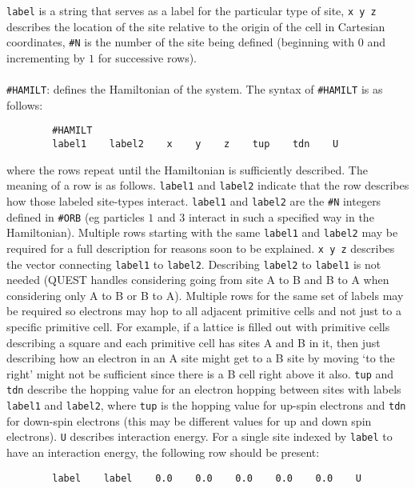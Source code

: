\documentclass[12pt]{article}
\begin{document}
        \texttt{label} is a string that serves as a label for the particular type of site, \texttt{x    y    z} describes the location of the site relative to the origin of the cell in Cartesian coordinates, \texttt{\#N} is the number of the site being defined (beginning with $0$ and incrementing by $1$ for successive rows). \\
        \\
        \texttt{\#HAMILT}: defines the Hamiltonian of the system.
        The syntax of \texttt{\#HAMILT} is as follows:
        \begin{verbatim}
        #HAMILT
        label1    label2    x    y    z    tup    tdn    U
        \end{verbatim}
        where the rows repeat until the Hamiltonian is sufficiently described.
        The meaning of a row is as follows.
        \texttt{label1} and \texttt{label2} indicate that the row describes how those labeled site-types interact.
        \texttt{label1} and \texttt{label2} are the \texttt{\#N} integers defined in \texttt{\#ORB} (eg particles $1$ and $3$ interact in such a specified way in the Hamiltonian).
        Multiple rows starting with the same \texttt{label1} and \texttt{label2} may be required for a full description for reasons soon to be explained.
        \texttt{x    y    z} describes the vector connecting \texttt{label1} to \texttt{label2}.
        Describing \texttt{label2} to \texttt{label1} is not needed (QUEST handles considering going from site A to B and B to A when considering only A to B or B to A).
        Multiple rows for the same set of labels may be required so electrons may hop to all adjacent primitive cells and not just to a specific primitive cell.
        For example, if a lattice is filled out with primitive cells describing a square and each primitive cell has sites A and B in it, then just describing how an electron in an A site might get to a B site by moving `to the right' might not be sufficient since there is a B cell right above it also.
        \texttt{tup} and \texttt{tdn} describe the hopping value for an electron hopping between sites with labels \texttt{label1} and \texttt{label2}, where \texttt{tup} is the hopping value for up-spin electrons and \texttt{tdn} for down-spin electrons (this may be different values for up and down spin electrons).
        \texttt{U} describes interaction energy.
        For a single site indexed by \texttt{label} to have an interaction energy, the following row should be present:
        \begin{verbatim}
        label    label    0.0    0.0    0.0    0.0    0.0    U
        \end{verbatim}
\end{document}
